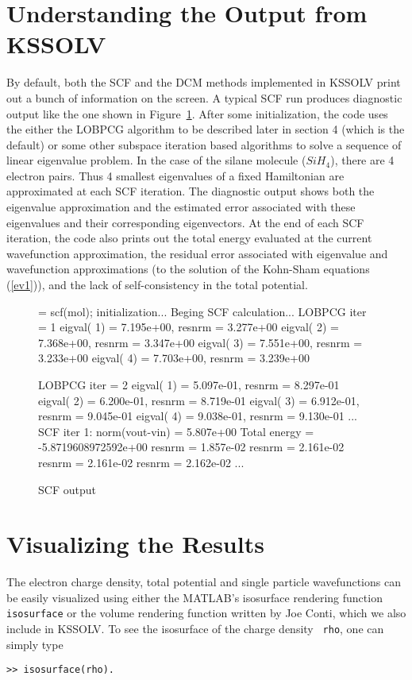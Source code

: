 \documentclass[11pt]{book}
\begin{document}
\section{Understanding the Output from KSSOLV}
By default, both the SCF and the DCM methods implemented in KSSOLV
print out a bunch of information on the screen.  A typical SCF run
produces diagnostic output like the one shown in Figure~\ref{sih4scf}.
After some initialization, the code uses the either the 
LOBPCG algorithm \cite{lobpcg} to be described later in section 4 (which is
the default) or some other subspace iteration based algorithms to solve 
a sequence of linear eigenvalue problem. In the case of the silane molecule 
($SiH_4$), there are 4 electron pairs. Thus 4 smallest eigenvalues of a 
fixed Hamiltonian are approximated at each SCF iteration.  The diagnostic 
output shows both the eigenvalue approximation and the estimated error 
associated with these eigenvalues and their corresponding eigenvectors. 
At the end of each SCF iteration,
the code also prints out the total energy evaluated at the current
wavefunction approximation, the residual error associated with 
eigenvalue and wavefunction approximations (to the solution of 
the Kohn-Sham equations (\ref{ev1})), and the lack of self-consistency in the
total potential.

\begin{figure}[htbp]
\begin{center}
\begin{boxedverbatim}
 = scf(mol);
initialization...
Beging SCF calculation...
LOBPCG iter =   1
eigval( 1) =   7.195e+00, resnrm =   3.277e+00
eigval( 2) =   7.368e+00, resnrm =   3.347e+00
eigval( 3) =   7.551e+00, resnrm =   3.233e+00
eigval( 4) =   7.703e+00, resnrm =   3.239e+00

LOBPCG iter =   2
eigval( 1) =   5.097e-01, resnrm =   8.297e-01
eigval( 2) =   6.200e-01, resnrm =   8.719e-01
eigval( 3) =   6.912e-01, resnrm =   9.045e-01
eigval( 4) =   9.038e-01, resnrm =   9.130e-01
...
SCF iter  1:
norm(vout-vin) =  5.807e+00
Total energy   = -5.8719608972592e+00
 resnrm =   1.857e-02
 resnrm =   2.161e-02
 resnrm =   2.161e-02
 resnrm =   2.162e-02
...
\end{boxedverbatim}
\caption{SCF output}
\label{sih4scf}
\end{center}
\end{figure}


\section{Visualizing the Results}
The electron charge density, total potential and single particle wavefunctions
can be easily visualized using either the MATLAB's isosurface rendering
function {\tt isosurface} or the volume rendering function written by Joe Conti, which 
we also include in KSSOLV.  To see the isosurface of the charge density {\tt
 rho}, one can simply type
\begin{verbatim}
>> isosurface(rho).
\end{verbatim}
\end{document}

